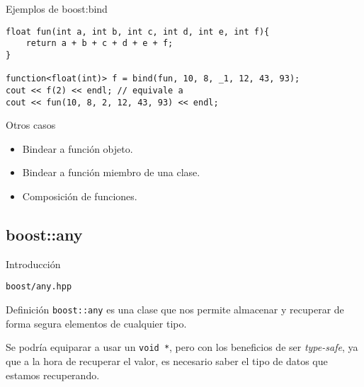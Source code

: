 \documentclass[8pt,xcolor=svgnames]{beamer}
\begin{document}
\begin{frame}[fragile]{Ejemplos de boost:bind}
  \begin{block}{}
\begin{verbatim}
float fun(int a, int b, int c, int d, int e, int f){
    return a + b + c + d + e + f;
}

function<float(int)> f = bind(fun, 10, 8, _1, 12, 43, 93);
cout << f(2) << endl; // equivale a
cout << fun(10, 8, 2, 12, 43, 93) << endl;
\end{verbatim}
  \end{block}

  \begin{block}{Otros casos}
    \begin{itemize}
    \item Bindear a función objeto.
    \item Bindear a función miembro de una clase.
    \item Composición de funciones.
    \end{itemize}
    
  \end{block}

\end{frame}

\subsection{boost::any}

\begin{frame}[fragile]{Introducción}
  \begin{block}{}
    \texttt{boost/any.hpp}
  \end{block}

  \begin{block}{Definición}
    \texttt{boost::any} es una clase que nos permite almacenar y
    recuperar de forma segura elementos de cualquier tipo.  
    
    \medskip
    
    Se podría equiparar a usar un \texttt{void *}, pero con los
    beneficios de ser \textit{type-safe}, ya que a la hora de
    recuperar el valor, es necesario saber el tipo de datos que
    estamos recuperando.
  \end{block}

\end{frame}
\end{document}
